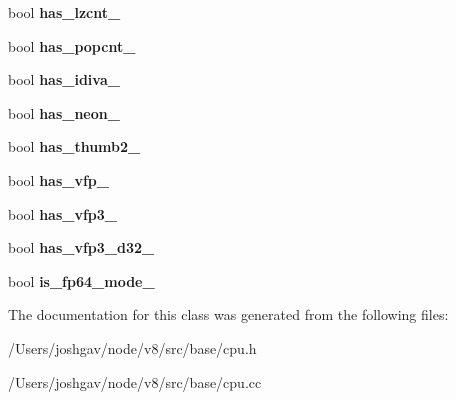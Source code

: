 \begin{DoxyCompactItemize}
\item 
bool {\bfseries has\+\_\+lzcnt\+\_\+}\hypertarget{classv8_1_1base_1_1_c_p_u_a338c08f5873890b4e7ffdcdd79d954fa}{}\label{classv8_1_1base_1_1_c_p_u_a338c08f5873890b4e7ffdcdd79d954fa}

\item 
bool {\bfseries has\+\_\+popcnt\+\_\+}\hypertarget{classv8_1_1base_1_1_c_p_u_ab7e13b2582541092663c2a6bf3a98aba}{}\label{classv8_1_1base_1_1_c_p_u_ab7e13b2582541092663c2a6bf3a98aba}

\item 
bool {\bfseries has\+\_\+idiva\+\_\+}\hypertarget{classv8_1_1base_1_1_c_p_u_a8a6a95790cecc1e296a5b452e3a67ac7}{}\label{classv8_1_1base_1_1_c_p_u_a8a6a95790cecc1e296a5b452e3a67ac7}

\item 
bool {\bfseries has\+\_\+neon\+\_\+}\hypertarget{classv8_1_1base_1_1_c_p_u_a8ae472f0da586b571d22fd970608d35c}{}\label{classv8_1_1base_1_1_c_p_u_a8ae472f0da586b571d22fd970608d35c}

\item 
bool {\bfseries has\+\_\+thumb2\+\_\+}\hypertarget{classv8_1_1base_1_1_c_p_u_ac477f4383ebacc409c0d1743866ec0d1}{}\label{classv8_1_1base_1_1_c_p_u_ac477f4383ebacc409c0d1743866ec0d1}

\item 
bool {\bfseries has\+\_\+vfp\+\_\+}\hypertarget{classv8_1_1base_1_1_c_p_u_a544663c1944936ef48a4369330f8ea67}{}\label{classv8_1_1base_1_1_c_p_u_a544663c1944936ef48a4369330f8ea67}

\item 
bool {\bfseries has\+\_\+vfp3\+\_\+}\hypertarget{classv8_1_1base_1_1_c_p_u_a2f3999e6439df52266ff2158df8b8be8}{}\label{classv8_1_1base_1_1_c_p_u_a2f3999e6439df52266ff2158df8b8be8}

\item 
bool {\bfseries has\+\_\+vfp3\+\_\+d32\+\_\+}\hypertarget{classv8_1_1base_1_1_c_p_u_a240ee3da5ac5bce65a3333a3a8f59bb1}{}\label{classv8_1_1base_1_1_c_p_u_a240ee3da5ac5bce65a3333a3a8f59bb1}

\item 
bool {\bfseries is\+\_\+fp64\+\_\+mode\+\_\+}\hypertarget{classv8_1_1base_1_1_c_p_u_adc8726a9240abddc8442399163db37c9}{}\label{classv8_1_1base_1_1_c_p_u_adc8726a9240abddc8442399163db37c9}

\end{DoxyCompactItemize}


The documentation for this class was generated from the following files\+:\begin{DoxyCompactItemize}
\item 
/\+Users/joshgav/node/v8/src/base/cpu.\+h\item 
/\+Users/joshgav/node/v8/src/base/cpu.\+cc\end{DoxyCompactItemize}
